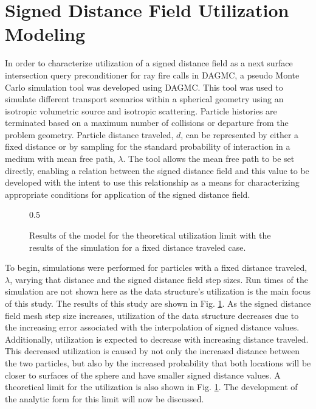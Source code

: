 \section{Signed Distance Field Utilization Modeling}

In order to characterize utilization of a signed distance field as a next
surface intersection query preconditioner for ray fire calls in DAGMC, a pseudo
Monte Carlo simulation tool was developed using DAGMC. This tool was used to
simulate different transport scenarios within a spherical geometry using an
isotropic volumetric source and isotropic scattering. Particle histories are
terminated based on a maximum number of collisions or departure from the problem
geometry. Particle distance traveled, $d$, can be represented by either a fixed
distance or by sampling for the standard probability of interaction in a medium
with mean free path, $\lambda$. The tool allows the mean free path to be set
directly, enabling a relation between the signed distance field and this value
to be developed with the intent to use this relationship as a means for
characterizing appropriate conditions for application of the signed distance field.

\begin{figure}[!htb]
  \centering
  {0.5\textwidth}
  \caption{Results of the model for the theoretical utilization limit with the
    results of the simulation for a fixed distance traveled case.}
  \label{fig:sdf_fixed_dist}    
\end{figure}

To begin, simulations were performed for particles with a fixed distance
traveled, $\lambda$, varying that distance and the
signed distance field step sizes. Run times of the simulation are not shown here
as the data structure's utilization is the main focus of this study. The results
of this study are shown in Fig. \ref{fig:sdf_fixed_dist}. As the signed distance
field mesh step size increases, utilization of the data structure decreases due
to the increasing error associated with the interpolation of signed distance
values. Additionally, utilization is expected to decrease with increasing
distance traveled. This decreased utilization is caused by not only the increased
distance between the two particles, but also by the increased probability
that both locations will be closer to surfaces of the sphere and have smaller
signed distance values. A theoretical limit for the utilization is also shown in
Fig. \ref{fig:sdf_fixed_dist}. The development of the analytic form for this limit will now be
discussed.

